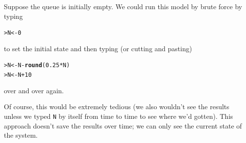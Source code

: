 \documentclass[11pt]{article}\usepackage[]{graphicx}\usepackage[]{color}
\makeatletter
\newcommand{\hlnum}[1]{\textcolor[rgb]{0.686,0.059,0.569}{#1}}%
\newcommand{\hlopt}[1]{\textcolor[rgb]{0,0,0}{#1}}%
\newcommand{\hlstd}[1]{\textcolor[rgb]{0.345,0.345,0.345}{#1}}%
\newcommand{\hlkwb}[1]{\textcolor[rgb]{0.69,0.353,0.396}{#1}}%
\newcommand{\hlkwd}[1]{\textcolor[rgb]{0.737,0.353,0.396}{\textbf{#1}}}%
\newenvironment{kframe}{%
 \def\at@end@of@kframe{}%
 \ifinner\ifhmode%
  \def\at@end@of@kframe{\end{minipage}}%
  \begin{minipage}{\columnwidth}%
 \fi\fi%
 \def\FrameCommand##1{\hskip\@totalleftmargin \hskip-\fboxsep
 \colorbox{shadecolor}{##1}\hskip-\fboxsep
     \hskip-\linewidth \hskip-\@totalleftmargin \hskip\columnwidth}%
 \MakeFramed {\advance\hsize-\width
   \@totalleftmargin\z@ \linewidth\hsize
   \@setminipage}}%
 {\par\unskip\endMakeFramed%
 \at@end@of@kframe}
\newenvironment{knitrout}{}{} %
\newcommand{\code}[1]{{\tt #1}}
\numberwithin{exercise}{section}
\makeatother
\begin{document}
Suppose the queue is initially empty.  We could run this model by brute force by
typing
\begin{knitrout}
\color{fgcolor}\begin{kframe}
\begin{alltt}
\hlstd{> }\hlstd{N} \hlkwb{<-} \hlnum{0}
\end{alltt}
\end{kframe}
\end{knitrout}
\noindent to set the initial state and then typing (or cutting and
pasting)
\begin{knitrout}
\color{fgcolor}\begin{kframe}
\begin{alltt}
\hlstd{> }\hlstd{N} \hlkwb{<-} \hlstd{N} \hlopt{-} \hlkwd{round}\hlstd{(}\hlnum{0.25} \hlopt{*} \hlstd{N)}
\hlstd{> }\hlstd{N} \hlkwb{<-} \hlstd{N} \hlopt{+} \hlnum{10}
\end{alltt}
\end{kframe}
\end{knitrout}
\noindent over and over again.

Of course, this would be extremely tedious (we also wouldn't see the 
results unless we typed \code{N} by itself from time to time
to see where we'd gotten).  This approach doesn't save the results
over time; we can only see the current state of the system.
\end{document}
